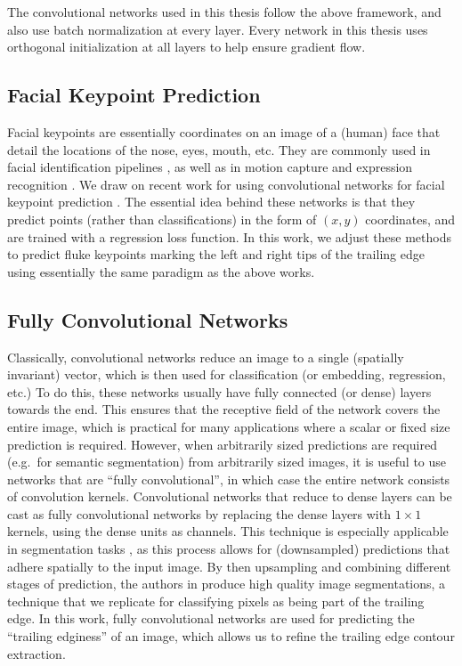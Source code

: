 The convolutional networks used in this thesis follow the above framework, and also use batch normalization \cite{ioffe2015batch} at every layer.
Every network in this thesis uses orthogonal initialization \cite{saxe2013exact} at all layers to help ensure gradient flow.

\subsection{Facial Keypoint Prediction}

Facial keypoints are essentially coordinates on an image of a (human) face that detail the locations of the nose, eyes, mouth, etc.
They are commonly used in facial identification pipelines \cite{taigman2014deepface}, as well as in motion capture \cite{akagi2013facial} and expression recognition \cite{berretti20113d}.
We draw on recent work for using convolutional networks for facial keypoint prediction \cite{sun2013deep, nouri2014using}. 
The essential idea behind these networks is that they predict points (rather than classifications) in the form of $(x, y)$ coordinates, and are trained with a regression loss function.
In this work, we adjust these methods to predict fluke keypoints marking the left and right tips of the trailing edge using essentially the same paradigm as the above works.

\subsection{Fully Convolutional Networks}

Classically, convolutional networks reduce an image to a single (spatially invariant) vector, which is then used for classification (or embedding, regression, etc.)
To do this, these networks usually have fully connected (or dense) layers towards the end.
This ensures that the receptive field of the network covers the entire image, which is practical for many applications where a scalar or fixed size prediction is required. 
However, when arbitrarily sized predictions are required (e.g.\ for semantic segmentation) from arbitrarily sized images, it is useful to use networks that are ``fully convolutional'', in which case the entire network consists of convolution kernels. 
Convolutional networks that reduce to dense layers can be cast as fully convolutional networks by replacing the dense layers with $1\times1$ kernels, using the dense units as channels.
This technique is especially applicable in segmentation tasks \cite{ning2005toward, ciresan2012deep, hariharan2014simultaneous}, as this process allows for (downsampled) predictions that adhere spatially to the input image.
By then upsampling and combining different stages of prediction, the authors in \cite{long2015fully} produce high quality image segmentations, a technique that we replicate for classifying pixels as being part of the trailing edge.
In this work, fully convolutional networks are used for predicting the ``trailing edginess'' of an image, which allows us to refine the trailing edge contour extraction. 


